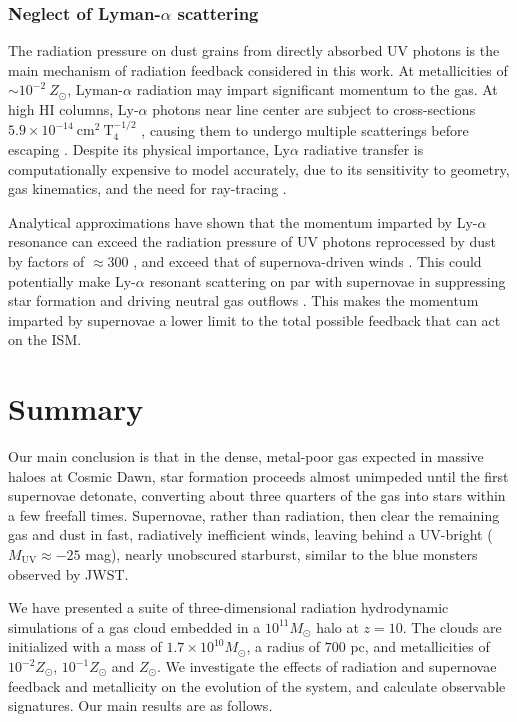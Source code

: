 \documentclass[twocolumn,linenumbers]{aastex631}
\begin{document}
\subsubsection{Neglect of Lyman-$\alpha$ scattering}
The radiation pressure on dust grains from directly absorbed UV photons is the main mechanism of radiation feedback considered in this work. At metallicities of $\sim 10^{-2}\ Z_\odot$, Lyman-$\alpha$ radiation may impart significant momentum to the gas. At high HI columns, Ly-$\alpha$ photons near line center are subject to cross-sections $5.9\times 10^{-14}\ \mathrm{cm^2\ T_4^{-1/2}}$ \citep{2024ARA&A..62..529T}, causing them to undergo multiple scatterings before escaping \citep{2008MNRAS.391..457D,2008ApJ...681..771M}. Despite its physical importance, Ly$\alpha$ radiative transfer is computationally expensive to model accurately, due to its sensitivity to geometry, gas kinematics, and the need for ray-tracing \citep{2020MNRAS.497.3925L, 2022ApJ...934...37M}. 

Analytical approximations have shown that the momentum imparted by Ly-$\alpha$ resonance can exceed the radiation pressure of UV photons reprocessed by dust by factors of $\approx 300$ \citep{2021MNRAS.504...89T}, and exceed that of supernova-driven winds \citep{2018MNRAS.475.4617K}. This could potentially make Ly-$\alpha$ resonant scattering on par with supernovae in suppressing star formation and driving neutral gas outflows \citep{2024ARA&A..62..529T, 2018MNRAS.475L.130A, Smith2019LyaEscape, Nebrin2024LyaFeedback}. This makes the momentum imparted by supernovae a lower limit to the total possible feedback that can act on the ISM.



\section{Summary}
Our main conclusion is that in the dense, metal-poor gas expected in massive haloes at Cosmic Dawn, star formation proceeds almost unimpeded until the first supernovae detonate, converting about three quarters of the gas into stars within a few freefall times. Supernovae, rather than radiation, then clear the remaining gas and dust in fast, radiatively inefficient winds, leaving behind a UV-bright ($M_\mathrm{UV} \approx -25$ mag), nearly unobscured starburst, similar to the blue monsters observed by JWST.

We have presented a suite of three-dimensional radiation hydrodynamic simulations of a gas cloud embedded in a $10^{11}M_\odot$ halo at $z=10$. The clouds are initialized with a mass of $1.7 \times 10^{10} M_\odot$, a radius of $700$ pc, and metallicities of $10^{-2}Z_\odot$, $10^{-1}Z_\odot$ and $Z_\odot$. We investigate the effects of radiation and supernovae feedback and metallicity on the evolution of the system, and calculate observable signatures. Our main results are as follows.
\end{document}
